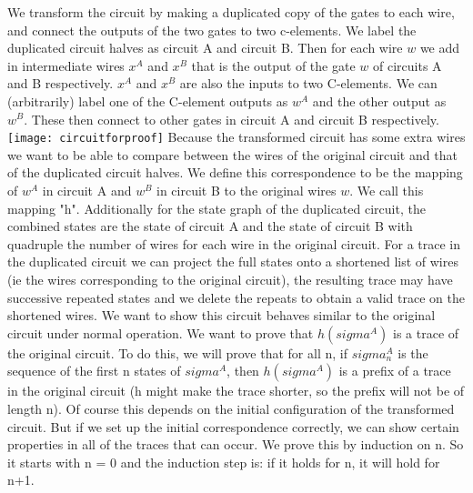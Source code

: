 \documentclass{article}
\begin{document}
We transform the circuit by making a duplicated copy of the gates to each wire, and connect the outputs of the two gates to two c-elements.  We label the duplicated circuit halves as circuit A and circuit B.  Then for each wire $w$ we add in intermediate wires $x^A$ and $x^B$ that is the output of the gate $w$ of circuits A and B respectively.  $x^A$ and $x^B$ are also the inputs to two C-elements.  We can (arbitrarily) label one of the C-element outputs as $w^A$ and the other output as $w^B$.  These then connect to other gates in circuit A and circuit B respectively. \newline
\texttt{[image: circuitforproof]}
Because the transformed circuit has some extra wires we want to be able to compare between the wires of the original circuit and that of the duplicated circuit halves.  We define this correspondence to be the mapping of $w^A$ in circuit A and $w^B$ in circuit B to the original wires $w$.  We call this mapping "h".  Additionally for the state graph of the duplicated circuit, the combined states are the state of circuit A and the state of circuit B with quadruple the number of wires for each wire in the original circuit.  For a trace in the duplicated circuit we can project the full states onto a shortened list of wires (ie the wires corresponding to the original circuit), the resulting trace may have successive repeated states and we delete the repeats to obtain a valid trace on the shortened wires.  %
\newline
We want to show this circuit behaves similar to the original circuit under normal operation.  We want to prove that $h(sigma^A)$ is a trace of the original circuit.  To do this, we will prove that for all n, if $sigma^A_n$ is the sequence of the first n states of $sigma^A$, then $h(sigma^A)$ is a prefix of a trace in the original circuit  (h might make the trace shorter, so the prefix will not be of length n).  %
Of course this depends on the initial configuration of the transformed circuit.  But if we set up the initial correspondence correctly, we can show certain properties in all of the traces that can occur.  
\newline
We prove this by induction on n.  So it starts with n = 0 and the induction step is: if it holds for n, it will hold for n+1.
\end{document}
